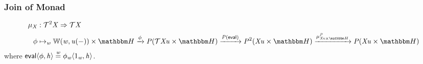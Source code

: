 \subsubsection*{Join of Monad}

\begin{definition}
\begin{align*}
    \mu_\vX & : \Exp\monFLS2\vX \To \monFLS\vX \\
    \phi & \mapsto_\vw \homF\worldC\vw{\tinstU(\dash)} \times \heapF \xto\phi \vP(\monFLS\vX\tinstU \times \heapF) \xto{\vP(\eval)} \Exp\vP2(\vX\tinstU \times \heapF)
    \xto{\mu^\vP_{\vX\tinstU \times \heapF}} \vP(\vX\tinstU \times \heapF)
\end{align*}
where $\mathsf{eval} \langle\phi, \mathit{h}\rangle \stackrel{\mathit{w}}{=} \phi_{\mathit{w}}\langle1_{\mathit{w}}, \mathit{h}\rangle$.
\end{definition}
